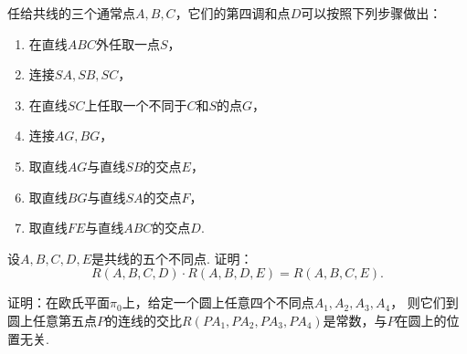 任给共线的三个通常点\(A,B,C\)，它们的第四调和点\(D\)可以按照下列步骤做出：\begin{enumerate}
	\item 在直线\(ABC\)外任取一点\(S\)，
	\item 连接\(SA,SB,SC\)，
	\item 在直线\(SC\)上任取一个不同于\(C\)和\(S\)的点\(G\)，
	\item 连接\(AG,BG\)，
	\item 取直线\(AG\)与直线\(SB\)的交点\(E\)，
	\item 取直线\(BG\)与直线\(SA\)的交点\(F\)，
	\item 取直线\(FE\)与直线\(ABC\)的交点\(D\).
\end{enumerate}

\begin{example}
设\(A,B,C,D,E\)是共线的五个不同点.
证明：\begin{equation*}
	R(A,B,C,D) \cdot R(A,B,D,E) = R(A,B,C,E).
\end{equation*}
\end{example}

\begin{example}
证明：在欧氏平面\(\pi_0\)上，给定一个圆上任意四个不同点\(A_1,A_2,A_3,A_4\)，
则它们到圆上任意第五点\(P\)的连线的交比\(R(PA_1,PA_2,PA_3,PA_4)\)是常数，与\(P\)在圆上的位置无关.
\end{example}
